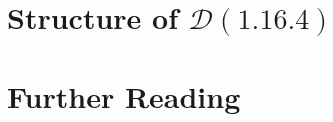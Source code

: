 \documentclass{book}
\theoremstyle{definition}\newtheorem{mechanism}{Mechanism}
\theoremstyle{remark}\newtheorem*{remark}{Remark}
\begin{document}

\chapter{Structure of $\mathcal D(\text{1.16.4})$}


\chapter{Further Reading}


\printbibliography

\printindex
\end{document}
